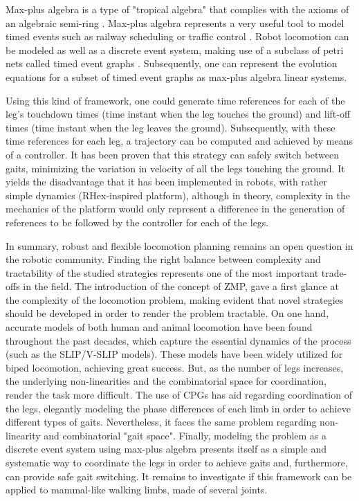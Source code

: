 \documentclass[../main.tex]{subfiles}
\begin{document}
	Max-plus algebra is a type of "tropical algebra" that complies with the axioms of an algebraic semi-ring \cite{Schutter2008}. Max-plus algebra represents a very useful tool to model timed events such as railway scheduling \cite{Goverde2007} or traffic control \cite{Turek2011}. Robot locomotion can be modeled as well as a discrete event system, making use of a subclass of petri nets called timed event graphs \cite{Schutter2009}. Subsequently, one can represent the evolution equations for a subset of timed event graphs as max-plus algebra linear systems. 
	
	Using this kind of framework, one could generate time references for each of the leg's touchdown times (time instant when the leg touches the ground) and lift-off times (time instant when the leg leaves the ground). Subsequently, with these time references for each leg, a trajectory can be computed and achieved by means of a controller. It has been proven that this strategy can safely switch between gaits, minimizing the variation in velocity of all the legs touching the ground. It yields the disadvantage that it has been implemented in robots, with rather simple dynamics (RHex-inspired platform), although in theory, complexity in the mechanics of the platform would only represent a difference in the generation of references to be followed by the controller for each of the legs.
	
	In summary, robust and flexible locomotion planning remains an open question in the robotic community. Finding the right balance between complexity and tractability of the studied strategies represents one of the most important trade-offs in the field. The introduction of the concept of ZMP, gave a first glance at the complexity of the locomotion problem, making evident that novel strategies should be developed in order to render the problem tractable. On one hand, accurate models of both human and animal locomotion have been found throughout the past decades, which capture the essential dynamics of the process (such as the SLIP/V-SLIP models). These models have been widely utilized for biped locomotion, achieving great success. But, as the number of legs increases, the underlying non-linearities and the combinatorial space for coordination, render the task more difficult. The use of CPGs has aid regarding coordination of the legs, elegantly modeling the phase differences of each limb in order to achieve different types of gaits. Nevertheless, it faces the same problem regarding non-linearity and combinatorial "gait space". Finally, modeling the problem as a discrete event system using max-plus algebra presents itself as a simple and systematic way to coordinate the legs in order to achieve gaits and, furthermore, can provide safe gait switching. It remains to investigate if this framework can be applied to mammal-like walking limbs, made of several joints. 
	
\end{document}
